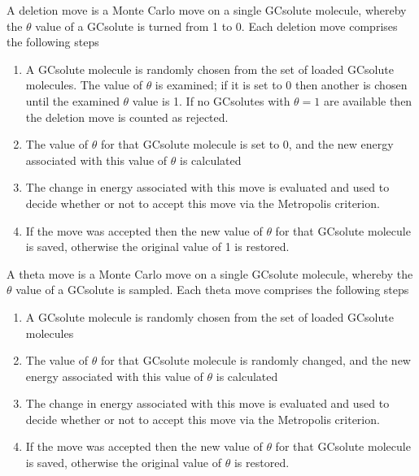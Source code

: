 \documentclass[letterpaper,10pt,english]{sphinxmanual}
\begin{document}
A deletion move is a Monte Carlo move on a single GCsolute molecule, whereby the \(\theta\) value of a GCsolute is turned from 1 to 0. Each deletion move comprises the following steps
\begin{enumerate}
\item {} 
A GCsolute molecule is randomly chosen from the set of loaded GCsolute molecules. The value of \(\theta\) is examined; if it is set to 0 then another is chosen until the examined \(\theta\) value is 1. If no GCsolutes with \(\theta=1\) are available then the deletion move is counted as rejected.

\item {} 
The value of \(\theta\) for that GCsolute molecule is set to 0, and the new energy associated with this value of \(\theta\) is calculated

\item {} 
The change in energy associated with this move is evaluated and used to decide whether or not to accept this move via the Metropolis criterion.

\item {} 
If the move was accepted then the new value of \(\theta\) for that GCsolute molecule is saved, otherwise the original value of 1 is restored.

\end{enumerate}

\ignorespaces 
{}

A theta move is a Monte Carlo move on a single GCsolute molecule, whereby the \(\theta\) value of a GCsolute is sampled. Each theta move comprises the following steps
\begin{enumerate}
\item {} 
A GCsolute molecule is randomly chosen from the set of loaded GCsolute molecules

\item {} 
The value of \(\theta\) for that GCsolute molecule is randomly changed, and the new energy associated with this value of \(\theta\) is calculated

\item {} 
The change in energy associated with this move is evaluated and used to decide whether or not to accept this move via the Metropolis criterion.

\item {} 
If the move was accepted then the new value of \(\theta\) for that GCsolute molecule is saved, otherwise the original value of \(\theta\) is restored.

\end{enumerate}
\end{document}
